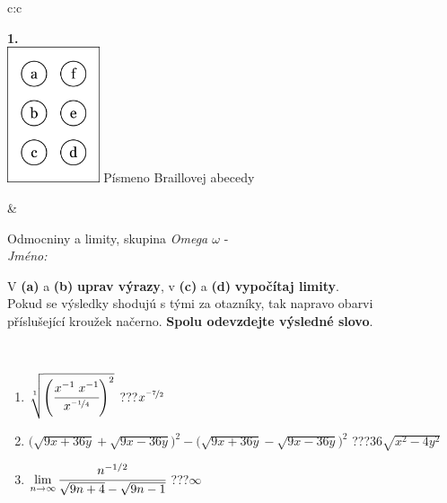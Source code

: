 \documentclass[10pt]{report}
\begin{document}
\begin{tabular}{c:c}
\begin{minipage}[c][104.5mm][t]{0.5\linewidth}
\begin{center}
\begin{minipage}{0.20\linewidth}
\begin{center}
{\Huge\bfseries 1.} \\[2mm]
\includegraphics[height=40mm]{../images/braille.png}
{\small Písmeno Braillovej abecedy}
\end{center}
\end{minipage}
\end{center}
\end{minipage}
&
\begin{minipage}[c][104.5mm][t]{0.5\linewidth}
\begin{center}
\vspace{7mm}
{\huge Odmocniny a limity, skupina \textit{Omega $\omega$} -}\\[5mm]
\textit{Jméno:}\phantom{xxxxxxxxxxxxxxxxxxxxxxxxxxxxxxxxxxxxxxxxxxxxxxxxxxxxxxxxxxxxxxxxx}\\[5mm]
\begin{minipage}{0.95\linewidth}
\begin{center}
V \textbf{(a)} a \textbf{(b)} \textbf{uprav výrazy}, v \textbf{(c)} a \textbf{(d)} \textbf{vypočítaj limity}.\\Pokud se výsledky shodujú s tými za otazníky, tak napravo obarvi\\příslušející kroužek načerno. \textbf{Spolu odevzdejte výsledné slovo}.
\end{center}
\end{minipage}
\\[1mm]
\begin{minipage}{0.79\linewidth}
\begin{center}
\begin{varwidth}{\linewidth}
\begin{enumerate}
\small
\item $\sqrt[1]{\left(\cfrac{x^{-1}\;x^{-1}}{x^{\nicefrac{-1}{4}}}\right)^{2}}$\quad \dotfill\; ???\;\dotfill \quad $x^{\nicefrac{-7}{2}}$
\item {\footnotesize{\scriptsize$\big(\sqrt{9x+36y}+\sqrt{9x-36y}\big)^2-\big(\sqrt{9x+36y}-\sqrt{9x-36y}\big)^2$}\quad \dotfill\; ???\;\dotfill \quad $36\sqrt{x^2-4y^2}$}
\item $\lim\limits_{n\to\infty}\cfrac{n^{-1/2}}{\sqrt{9n+4}-\sqrt{9n-1}}$\quad \dotfill\; ???\;\dotfill \quad $\infty$

\end{enumerate}
\end{varwidth}
\end{center}
\end{minipage}
\end{center}
\end{minipage}
\end{tabular}
\end{document}
